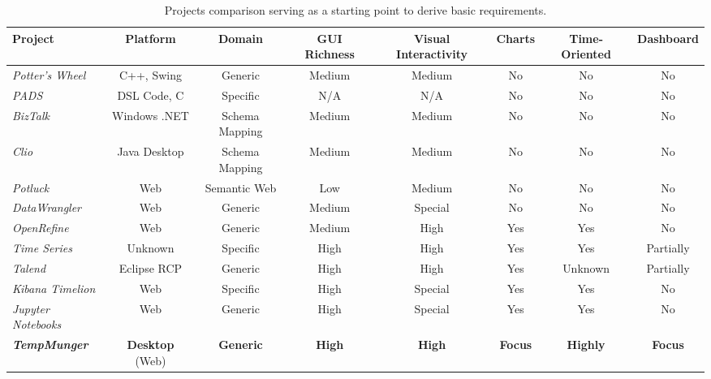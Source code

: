\begin{table}
  \centering
  \begin{tabular}{|l|c|c|c|c|c|c|c|}
    \hline \textbf{Project} & \textbf{Platform} & \textbf{Domain} & \textbf{GUI Richness} & \textbf{Visual Interactivity} & \textbf{Charts} & \textbf{Time-Oriented} & \textbf{Dashboard}  \\
    \hline
    \hline
    \hline \emph{Potter's Wheel}     & C++, Swing    & Generic         & Medium  & Medium   & No   & No      & No         \\
    \hline \emph{PADS}               & DSL Code, C   & Specific        & N/A     & N/A      & No   & No      & No         \\
    \hline \emph{BizTalk}            & Windows .NET  & Schema Mapping  & Medium  & Medium   & No   & No      & No         \\
    \hline \emph{Clio}               & Java Desktop  & Schema Mapping  & Medium  & Medium   & No   & No      & No         \\
    \hline \emph{Potluck}            & Web           & Semantic Web    & Low     & Medium   & No   & No      & No         \\
    \hline \emph{DataWrangler}       & Web           & Generic         & Medium  & Special  & No   & No      & No         \\
    \hline \emph{OpenRefine}         & Web           & Generic         & Medium  & High     & Yes  & Yes     & No         \\
    \hline \emph{Time Series}        & Unknown       & Specific        & High    & High     & Yes  & Yes     & Partially  \\
    \hline \emph{Talend}             & Eclipse RCP   & Generic         & High    & High     & Yes  & Unknown & Partially  \\
    \hline \emph{Kibana Timelion}    & Web           & Specific        & High    & Special  & Yes  & Yes     & No         \\
    \hline \emph{Jupyter Notebooks}  & Web           & Generic         & High    & Special  & Yes  & Yes     & No         \\
    \hline
    \hline \emph{\textbf{TempMunger}}  & \textbf{Desktop} (Web)  & \textbf{Generic}  & \textbf{High}  & \textbf{High}  & \textbf{Focus}  & \textbf{Highly} & \textbf{Focus}  \\
    \hline
  \end{tabular}
  \caption{Projects comparison serving as a starting point to derive basic requirements.}
  \label{tab:comparison}
\end{table}

